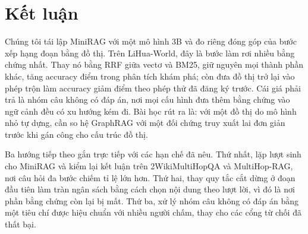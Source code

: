 \section{Kết luận}\label{sec:conclusion}
Chúng tôi tái lập MiniRAG với một mô hình 3B và đo riêng đóng góp của bước xếp hạng đoạn bằng đồ thị.
Trên LiHua-World, đây là bước làm rơi nhiều bằng chứng nhất.
Thay nó bằng RRF giữa vectơ và BM25, giữ nguyên mọi thành phần khác, tăng accuracy \diffXC{} điểm trong phân tích khám phá; còn đưa đồ thị trở lại vào phép trộn làm accuracy giảm \diffHC{} điểm theo phép thử đã đăng ký trước.
Cái giá phải trả là nhóm câu không có đáp án, nơi mọi cấu hình đưa thêm bằng chứng vào ngữ cảnh đều có xu hướng kém đi.
Bài học rút ra là: với một đồ thị do mô hình nhỏ tự dựng, cần so hệ GraphRAG với một đối chứng truy xuất lai đơn giản trước khi gán công cho cấu trúc đồ thị.

Ba hướng tiếp theo gắn trực tiếp với các hạn chế đã nêu.
Thứ nhất, lặp lượt sinh cho MiniRAG và kiểm lại kết luận trên 2WikiMultiHopQA và MultiHop-RAG, nơi câu hỏi đa bước chiếm tỉ lệ lớn hơn.
Thứ hai, thay quy tắc cắt dừng ở đoạn đầu tiên làm tràn ngân sách bằng cách chọn nội dung theo lượt lời, vì đó là nơi phần bằng chứng còn lại bị mất.
Thứ ba, xử lý nhóm câu không có đáp án bằng một tiêu chí được hiệu chuẩn với nhiều người chấm, thay cho các cổng từ chối đã thất bại.
